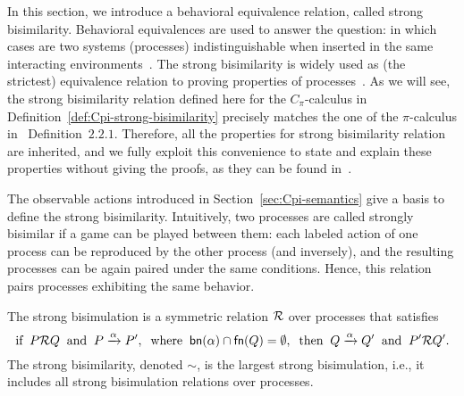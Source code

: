 In this section, we introduce a behavioral equivalence relation, called strong bisimilarity. Behavioral equivalences are used to answer the question: in which cases are two systems (processes) indistinguishable when inserted in the same interacting environments~\cite{DBLP:reference/parallel/Nicola11}.
The strong bisimilarity is widely used as (the strictest) equivalence relation to proving properties of processes~\cite{DBLP:series/hhl/BaetenS14, DBLP:journals/toplas/Sangiorgi09, sangiorgi2011introduction}. 
As we will see, the strong bisimilarity relation defined here for the $C_\pi$-calculus in Definition~\ref{def:Cpi-strong-bisimilarity} precisely matches the one of the $\pi$-calculus in~\cite{pi_calculus} Definition~$2.2.1$. Therefore, all the properties for strong bisimilarity relation are inherited, and we fully exploit this convenience to state and explain these properties without giving the proofs, as they can be found in~\cite{pi_calculus}. 

The observable actions introduced in Section~\ref{sec:Cpi-semantics} give a basis to define the strong bisimilarity. %
Intuitively, two processes are called strongly bisimilar if a game can be played between them: each labeled action of one process can be reproduced by the other process (and inversely), and the resulting processes can be again paired under the same conditions. %
Hence, this relation pairs processes exhibiting the same behavior.

\begin{definition}\label{def:Cpi-strong-bisimilarity}
The strong bisimulation is a symmetric relation ${\cal R}$ over processes that satisfies 
\[
\mbox{if}\;\; P{\cal R}Q \;\;\mbox{and}\;\; P\xrightarrow{\alpha}P', \;\;\mbox{where}\;\; \mathsf{bn}(\alpha)\cap\mathsf{fn}(Q)=\emptyset, \;\;\mbox{then}\;\; Q\xrightarrow{\alpha}Q' \;\;\mbox{and}\;\; P'{\cal R}Q'.
\]
The strong bisimilarity, denoted $\sim$, is the largest strong bisimulation, i.e., it includes all strong bisimulation relations over processes.
\end{definition}

